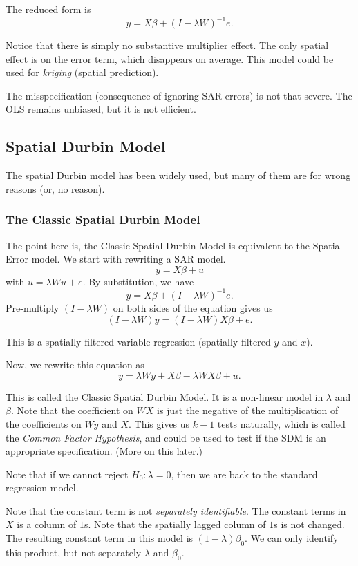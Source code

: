 \documentclass[11pt,a4paper]{amsart}
\theoremstyle{plain}
\theoremstyle{definition}
\begin{document}
The reduced form is 
\[	y = X\beta + (I-\lambda W)^{-1}e.	\]

Notice that there is simply no substantive multiplier effect. The only spatial effect is on the error term, which disappears on average. This model could be used for \textit{kriging} (spatial prediction).

The misspecification (consequence of ignoring SAR errors) is not that severe. The OLS remains unbiased, but it is not efficient. 

\subsection{Spatial Durbin Model}\hfill\par 
The spatial Durbin model has been widely used, but many of them are for wrong reasons (or, no reason). 
\subsubsection{The Classic Spatial Durbin Model}\hfill\par 
The point here is, the Classic Spatial Durbin Model is equivalent to the Spatial Error model. We start with rewriting a SAR model. 
\[	y  = X\beta + u 	\]
with $u = \lambda W u + e$. 
By substitution, we have 
\[	y = X\beta + (I-\lambda W)^{-1}e.	\]
Pre-multiply $(I-\lambda W)$ on both sides of the equation gives us
\[	(I-\lambda W)y = (I-\lambda W)X\beta + e.	\]

This is a spatially filtered variable regression (spatially filtered $y$ and $x$).

Now, we rewrite this equation as 
\begin{equation}\label{sdm}
	y = \lambda W y + X \beta - \lambda WX \beta + u.
\end{equation}

This is called the Classic Spatial Durbin Model. It is a non-linear model in $\lambda$ and $\beta$. Note that the coefficient on $WX$ is just the negative of the multiplication of the coefficients on $Wy$ and $X$. This gives us $k-1$ tests naturally, which is called the \textit{Common Factor Hypothesis}, and could be used to test if the SDM is an appropriate specification. (More on this later.)

Note that if we cannot reject $H_{0}: \lambda = 0$, then we are back to the standard regression model.

Note that the constant term is not \textit{separately identifiable}. The constant terms in $X$ is a column of $1$s. Note that the spatially lagged column of $1$s is not changed. The resulting constant term in this model is $(1-\lambda) \beta_{0}$. We can only identify this product, but not separately $\lambda$ and $\beta_{0}$. 
\end{document}
